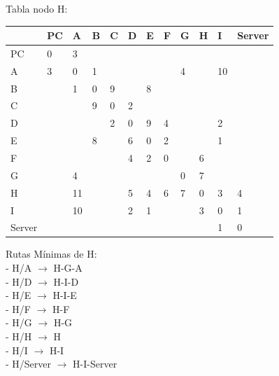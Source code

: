 \documentclass[a4paper]{article}
\begin{document}
\begin{table}[ht]
Tabla nodo H:\\
\begin{tabular}{|l|l|l|l|l|l|l|l|l|l|l|l|}
\hline
       & PC & A  & B & C & D & E & F & G & H & I  & Server \\ \hline
PC     & 0  & 3  &   &   &   &   &   &   &   &    &        \\ \hline
A      & 3  & 0  & 1 &   &   &   &   & 4 &   & 10 &        \\ \hline
B      &    & 1  & 0 & 9 &   & 8 &   &   &   &    &        \\ \hline
C      &    &    & 9 & 0 & 2 &   &   &   &   &    &        \\ \hline
D      &    &    &   & 2 & 0 & 9 & 4 &   &   & 2  &        \\ \hline
E      &    &    & 8 &   & 6 & 0 & 2 &   &   & 1  &        \\ \hline
F      &    &    &   &   & 4 & 2 & 0 &   & 6 &    &        \\ \hline
G      &    & 4  &   &   &   &   &   & 0 & 7 &    &        \\ \hline
H      &    & 11 &   &   & 5 & 4 & 6 & 7 & 0 & 3  & 4      \\ \hline
I      &    & 10 &   &   & 2 & 1 &   &   & 3 & 0  & 1      \\ \hline
Server &    &    &   &   &   &   &   &   &   & 1  & 0      \\ \hline
\end{tabular}

Rutas Mínimas de H:\\
-	H/A  $\rightarrow$  H-G-A\\
-	H/D  $\rightarrow$  H-I-D\\
-	H/E  $\rightarrow$ H-I-E\\
-	H/F  $\rightarrow$  H-F\\
-	H/G  $\rightarrow$  H-G\\
-	H/H  $\rightarrow$  H\\
-	H/I  $\rightarrow$  H-I\\
-	H/Server  $\rightarrow$  H-I-Server\\
\end{table}
\end{document}
